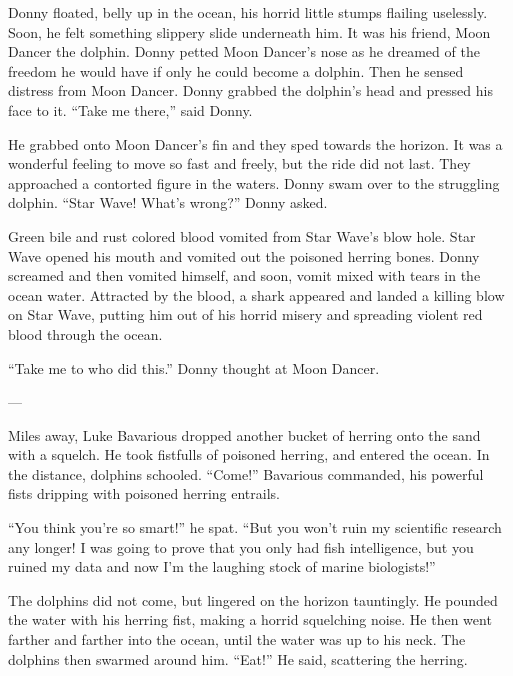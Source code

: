 Donny floated, belly up in the ocean, his horrid little stumps
flailing uselessly. Soon, he felt something slippery slide
underneath him. It was his friend, Moon Dancer the dolphin. Donny
petted Moon Dancer's nose as he dreamed of the freedom he would
have if only he could become a dolphin. Then he sensed distress
from Moon Dancer. Donny grabbed the dolphin's head and pressed his
face to it. ``Take me there,'' said Donny.



He grabbed onto Moon Dancer's fin and they sped towards the
horizon. It was a wonderful feeling to move so fast and freely, but
the ride did not last. They approached a contorted figure in the
waters. Donny swam over to the struggling dolphin. ``Star Wave!
What's wrong?'' Donny asked.



Green bile and rust colored blood vomited from Star Wave's blow
hole. Star Wave opened his mouth and vomited out the poisoned
herring bones. Donny screamed and then vomited himself, and soon,
vomit mixed with tears in the ocean water. Attracted by the blood,
a shark appeared and landed a killing blow on Star Wave, putting
him out of his horrid misery and spreading violent red blood
through the ocean.



``Take me to who did this.'' Donny thought at Moon Dancer.



---



Miles away, Luke Bavarious dropped another bucket of herring onto
the sand with a squelch. He took fistfulls of poisoned herring, and
entered the ocean. In the distance, dolphins schooled. ``Come!''
Bavarious commanded, his powerful fists dripping with poisoned
herring entrails.



``You think you're so smart!'' he spat. ``But you won't ruin my
scientific research any longer! I was going to prove that you only
had fish intelligence, but you ruined my data and now I'm the
laughing stock of marine biologists!''



The dolphins did not come, but lingered on the horizon tauntingly.
He pounded the water with his herring fist, making a horrid
squelching noise. He then went farther and farther into the ocean,
until the water was up to his neck. The dolphins then swarmed
around him. ``Eat!'' He said, scattering the herring.



